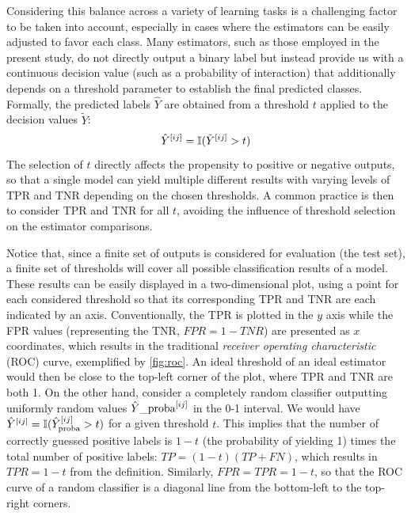 Considering this balance across a variety of learning tasks
is a challenging factor to be taken into account, especially in cases where the estimators can be easily adjusted to favor each class.
%
Many estimators, such as those employed in the present study, do not directly output a binary label but instead provide us with a continuous decision value (such as a probability of interaction) that additionally depends on a threshold parameter to establish the final predicted classes. Formally, the predicted labels $\hat Y$ are obtained from a threshold $t$ applied to the decision values $\tilde Y$:
%
\begin{equation}
    \hat Y^{[ij]} = \mathbb{I}(\tilde Y^{[ij]} > t)
\end{equation}
%
The selection of $t$ directly affects the propensity to positive or negative outputs, so that a single model can yield multiple different results with varying levels of TPR and TNR depending on the chosen thresholds.
A common practice is then to consider TPR and TNR for all $t$, avoiding the influence of threshold selection on the estimator comparisons.

Notice that, since a finite set of outputs is considered for evaluation (the test set), a finite set of thresholds will cover all possible classification results of a model. These results can be easily displayed in a two-dimensional plot, using a point for each considered threshold so that its corresponding TPR and TNR are each indicated by an axis. Conventionally, the TPR is plotted in the $y$ axis while the FPR values (representing the TNR, $FPR=1-TNR$) are presented as $x$ coordinates, which results in the traditional \emph{receiver operating characteristic} (ROC) curve, exemplified by \autoref{fig:roc}.
%
An ideal threshold of an ideal estimator would then be close to the top-left corner of the plot, where TPR and TNR are both 1.
On the other hand, consider a completely random classifier outputting uniformly random values $\hat Y\_\text{proba}^{[ij]}$ in the 0-1 interval. We would have $\hat Y^{[ij]} = \mathbb{I}(\hat Y_\text{proba}^{[ij]} > t)$ for a given threshold $t$. This implies that the number of correctly guessed positive labels is $1-t$ (the probability of yielding 1) times the total number of positive labels: $TP = (1-t) (TP+FN)$, which results in $TPR = 1-t$ from the definition. Similarly, $FPR = TPR = 1-t$, so that the ROC curve of a random classifier is a diagonal line from the bottom-left to the top-right corners.

